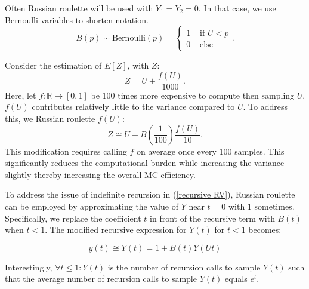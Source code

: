 \documentclass[a4paper,12pt]{article}
\begin{document}
\begin{notation}[$B(p)$]
  Often Russian roulette will be used with $Y_{1}= Y_{2}= 0$.
  In that case, we use Bernoulli variables to shorten notation.
  \begin{equation}
    B(p) \sim \text{Bernoulli}(p) =
    \begin{cases}
      1 & \text{ if } U<p \\
      0 & \text{ else }
    \end{cases} .
  \end{equation}
\end{notation}

\begin{example} \label{ex:simple russian roulette}
  Consider the estimation of $E[Z]$, with $Z$:
  \begin{equation} \label{eq:simple russian roulette}
    Z = U + \frac{f(U)}{1000}.
  \end{equation}
  Here, let $f:\mathbb{R} \rightarrow [0,1]$ be $100$ times more expensive to compute then sampling $U$.
  $f(U)$ contributes relatively little to the variance compared to $U$. To address this, we Russian roulette $f(U)$:
  \begin{equation}
    Z \cong U + B\left(\frac{1}{100}\right)\frac{f(U)}{10}.
  \end{equation}
  This modification requires calling $f$ on
  average once every $100$ samples. This significantly reduces the
  computational burden while increasing the variance slightly thereby increasing
  the overall MC efficiency.\\
\end{example}



\begin{example} \label{ex: russian roulette}
  To address the issue of indefinite recursion in
  (\ref{recursive RV}), Russian roulette can be employed
  by approximating the value of $Y$ near $t = 0$ with $1$
  sometimes. Specifically, we replace the coefficient $t$
  in front of the recursive term with $B(t)$ when $t < 1$.
  The modified recursive expression for $Y(t)$ for $t<1$ becomes:

  \begin{equation}\label{eq:rr example}
    y(t) \cong Y(t) = 1 + B(t)Y(Ut)
  \end{equation}

  Interestingly, $\forall t \le 1:Y(t)$ is the number of recursion calls
  to sample $Y(t)$ such that the average number of recursion
  calls to sample $Y(t)$ equals $e^{t}$.

\end{example}
\end{document}

